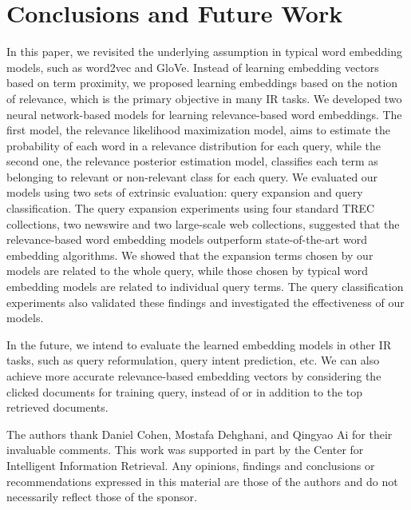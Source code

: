 \documentclass[sigconf]{acmart}
\begin{document}
\section{Conclusions and Future Work}
\label{sec:conclusion}
In this paper, we revisited the underlying assumption in typical word embedding models, such as word2vec and GloVe. Instead of learning embedding vectors based on term proximity, we proposed learning embeddings based on the notion of relevance, which is the primary objective in many IR tasks. We developed two neural network-based models for learning relevance-based word embeddings. The first model, the relevance likelihood maximization model, aims to estimate the probability of each word in a relevance distribution for each query, while the second one, the relevance posterior estimation model, classifies each term as belonging to relevant or non-relevant class for each query. We evaluated our models using two sets of extrinsic evaluation: query expansion and query classification. The query expansion experiments using four standard TREC collections, two newswire and two large-scale web collections, suggested that the relevance-based word embedding models outperform state-of-the-art word embedding algorithms. We showed that the expansion terms chosen by our models are related to the whole query, while those chosen by typical word embedding models are related to individual query terms. The query classification experiments also validated these findings and investigated the effectiveness of our models.

In the future, we intend to evaluate the learned embedding models in other IR tasks, such as query reformulation, query intent prediction, etc. We can also achieve more accurate relevance-based embedding vectors by considering the clicked documents for training query, instead of or in addition to the top retrieved documents. 

\medskip
\small
{}
The authors thank Daniel Cohen, Mostafa Dehghani, and Qingyao Ai for their invaluable comments. This work was supported in part by the Center for Intelligent Information Retrieval. Any opinions, findings and conclusions or recommendations expressed in this material are those of the authors and do not necessarily reflect those of the sponsor. 

\vspace{-0.1cm}

  
\end{document}
